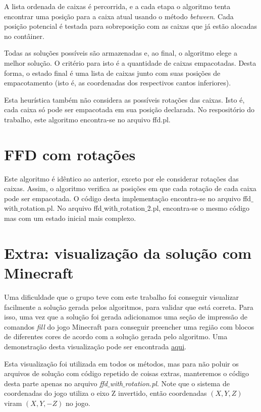 \documentclass[12pt]{article}
\begin{document}
A lista ordenada de caixas é percorrida, e a cada etapa o algoritmo tenta encontrar uma posição para a caixa atual usando o método \emph{between}. Cada posição potencial é testada para sobreposição com as caixas que já estão alocadas no contâiner.

Todas as soluções possíveis são armazenadas e, ao final, o algoritmo elege a melhor solução. O critério para isto é a quantidade de caixas empacotadas. Desta forma, o estado final é uma lista de caixas junto com suas posições de empacotamento (isto é, as coordenadas dos respectivos cantos inferiores).

Esta heurística também não considera as possíveis rotações das caixas. Isto é, cada caixa só pode ser empacotada em sua posição declarada. No respositório do trabalho, este algoritmo encontra-se no arquivo ffd.pl.


\section{FFD com rotações}

Este algoritmo é idêntico ao anterior, exceto por ele considerar rotações das caixas. Assim, o algoritmo verifica as posições em que cada rotação de cada caixa pode ser empacotada. O código desta implementação encontra-se no arquivo ffd$\_$with$\_$rotation.pl. No arquivo ffd$\_$with$\_$rotation$\_$2.pl, encontra-se o mesmo código mas com um estado inicial mais complexo.

\section{Extra: visualização da solução com Minecraft}

Uma dificuldade que o grupo teve com este trabalho foi conseguir visualizar facilmente a solução gerada pelos algoritmos, para validar que está correta. Para isso, uma vez que a solução foi gerada adicionamos uma seção de impressão de comandos \textit{fill} do jogo Minecraft para conseguir preencher uma região com blocos de diferentes cores de acordo com a solução gerada pelo algoritmo. Uma demonstração desta visualização pode ser encontrada \href{https://www.youtube.com/watch?v=qInZZb9y1dQ}{aqui}.

Esta visualização foi utilizada em todos os métodos, mas para não poluir os arquivos de solução com código repetido de coisas extras, manteremos o código desta parte apenas no arquivo \textit{ffd$\_$with$\_$rotation.pl}. Note que o sistema de coordenadas do jogo utiliza o eixo Z invertido, então coordenadas $(X, Y, Z)$ viram $(X, Y, -Z)$ no jogo.
\end{document}
